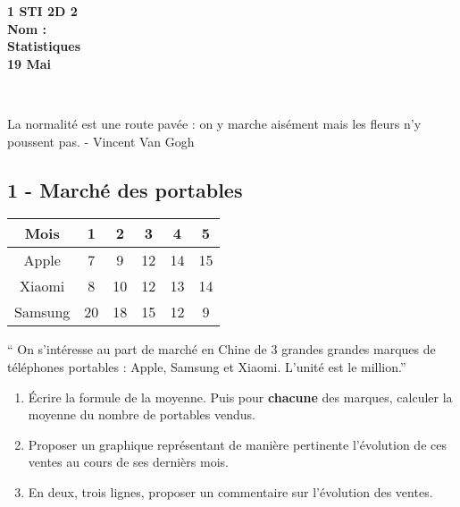 \documentclass[12pt]{article}
\begin{document}

\begin{minipage}[t]{\textwidth}
  \raggedright
      {\bfseries 1 STI 2D 2}\\[.35ex]
      {\bfseries Nom : }\\[.35ex]
      \vspace*{-1cm}
      \raggedleft
          {\bfseries Statistiques}\\[.35ex]
          {\bfseries 19 Mai}\\[.35ex]
\end{minipage}\\[1em]

\begin{center}
  \textsf{La normalité est une route pavée : on y marche aisément mais les fleurs n'y poussent pas. - Vincent Van Gogh}\\
\end{center}

\setlength{\columnseprule}{1pt}

\begin{multicols}{2}

  \subsection*{1 - Marché des portables}

  \begin{center}
    \begin{tabular}{| c || c | c | c | c | c |}
      \hline
      Mois    & 1  & 2  & 3  &  4 & 5 \\
      \hline
      Apple   & 7  & 9  & 12 & 14 & 15\\
      \hline
      Xiaomi  & 8  & 10 & 12 & 13 & 14\\
      \hline
      Samsung & 20 & 18 & 15 & 12 & 9 \\
      \hline
    \end{tabular}
  \end{center}


  `` On s'intéresse au part de marché en Chine de 3 grandes grandes marques de téléphones portables : Apple, Samsung et Xiaomi. L'unité est le million.''\\

  \begin{enumerate}
  \item[1.] Écrire la formule de la moyenne. Puis pour \textbf{chacune} des marques, calculer la moyenne du nombre de portables vendus. 
  \item[2.] Proposer un graphique représentant de manière pertinente l'évolution de ces ventes au cours de ses dernièrs mois.
  \item[3.] En deux, trois lignes, proposer un commentaire sur l'évolution des ventes.
  \end{enumerate}

\end{multicols}
\end{document}
